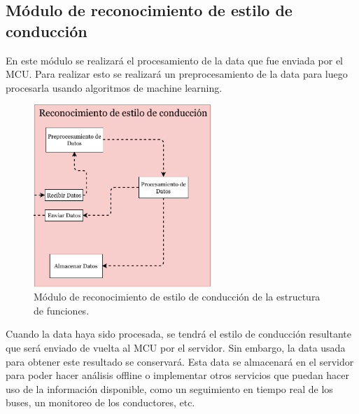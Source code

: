 \subsection{Módulo de reconocimiento de estilo de conducción}
En este módulo se realizará el procesamiento de la data que fue enviada por el MCU. Para realizar esto se realizará un preprocesamiento de la data para luego procesarla usando algoritmos de machine learning.

\begin{figure}[htbp!]
\centering
\includegraphics[width=0.6\textwidth]{rec.pdf}
\caption{Módulo de reconocimiento de estilo de conducción de la estructura de funciones.}
\label{fig:3.7}
\end{figure}

Cuando la data haya sido procesada, se tendrá el estilo de conducción resultante que será enviado de vuelta al MCU por el servidor. Sin embargo, la data usada para obtener este resultado se conservará. Esta data se almacenará en el servidor para poder hacer análisis offline o implementar otros servicios que puedan hacer uso de la información disponible, como un seguimiento en tiempo real de los buses, un monitoreo de los conductores, etc.
